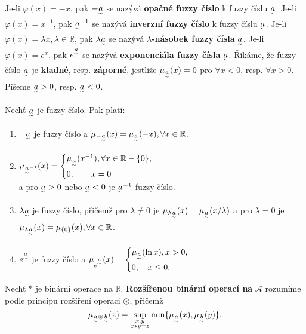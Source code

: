 {\begin{definition}
Je-li $\varphi(x)=-x$, pak $-\underset{^\sim}a$ se nazývá \textbf{opačné fuzzy číslo} k fuzzy číslu $\underset{^\sim}a$. Je-li $\varphi(x)=x^{-1}$, pak $\underset{^\sim}a^{-1}$ se nazývá \textbf{inverzní fuzzy číslo} k fuzzy číslu $\underset{^\sim}a$. Je-li $\varphi(x)=\lambda x, \lambda \in \mathbb{R}$, pak $\lambda \underset{^\sim}a$ se nazývá {\boldmath$\lambda$}\textbf{-násobek fuzzy čísla} $\underset{^\sim}a$. Je-li $\varphi(x)=e^{x}$, pak $e^{\underset{^\sim}a}$ se nazývá \textbf{exponenciála fuzzy čísla} $\underset{^\sim}a$. Říkáme, že fuzzy číslo $\underset{^\sim}a$ je \textbf{kladné}, resp. \textbf{záporné}, jestliže $\mu_{\underset{^\sim}a}(x)=0$ pro $\forall x < 0$, resp. $\forall x > 0$. Píšeme $\underset{^\sim}a>0$, resp. $\underset{^\sim}a < 0$.
\end{definition}

\begin{theorem}
Nechť $\underset{^\sim}a$ je fuzzy číslo. Pak platí:
\begin{enumerate}
\item $-\underset{^\sim}a$ je fuzzy číslo a $\mu_{-\underset{^\sim}a}(x)=\mu_{\underset{^\sim}a}(-x), \forall x \in \mathbb{R}$.
\item $\mu_{\underset{^\sim}a^{-1}}(x) =
	\begin{cases}
		\mu_{\underset{^\sim}a}(x^{-1}), \forall x \in \mathbb{R} - \lbrace 0 \rbrace, \\
		0, \qquad x=0
    \end{cases}$ \\
    a pro $\underset{^\sim}a > 0$ nebo $\underset{^\sim}a < 0$ je $\underset{^\sim}a^{-1}$ fuzzy číslo.
\item $\lambda\underset{^\sim}a$ je fuzzy číslo, přičemž pro $\lambda \neq 0$ je $\mu_{\lambda\underset{^\sim}a}(x)=\mu_{\underset{^\sim}a}(x/\lambda)$ a pro $\lambda = 0$ je $\mu_{\lambda\underset{^\sim}a}(x) = \mu_{\lbrace 0 \rbrace}(x), \forall x \in \mathbb{R}$.
\item $e^{\underset{^\sim}a}$ je fuzzy číslo a $\mu_{e^{\underset{^\sim}a}}(x) = \begin{cases}
\mu_{\underset{^\sim}a}(\ln{x}), x > 0, \\
0, \quad x \leq 0.
\end{cases}$
\end{enumerate}
\end{theorem}

\begin{definition}
Nechť $\ast$ je binární operace na $\mathbb{R}$. \textbf{Rozšířenou binární operací na} $\mathcal{A}$ rozumíme podle principu rozšíření operaci $\circledast$, přičemž
\begin{equation*}
\mu_{\underset{^\sim}a \circledast \underset{^\sim}b}(z) = \sup\limits_{\substack{x, y \\ x \ast y = z}} \min \lbrace \mu_{\underset{^\sim}a}(x), \mu_{\underset{^\sim}b}(y) \rbrace.
\end{equation*}
\end{definition}

}
